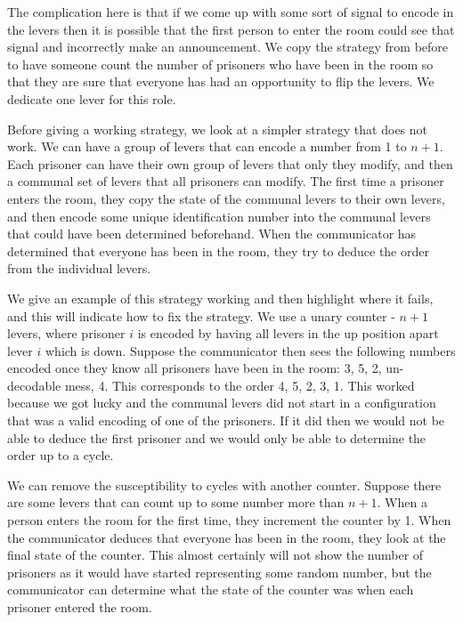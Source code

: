 \begin{parts}
	\begin{solution}
		
		The complication here is that if we come up with some sort of signal to encode in the levers then it is possible that the first person to enter the room could see that signal and incorrectly make an announcement. We copy the strategy from before to have someone count the number of prisoners who have been in the room so that they are sure that everyone has had an opportunity to flip the levers. We dedicate one lever for this role.
		
		Before giving a working strategy, we look at a simpler strategy that does not work. We can have a group of levers that can encode a number from 1 to $n + 1$. Each prisoner can have their own group of levers that only they modify, and then a communal set of levers that all prisoners can modify. The first time a prisoner enters the room, they copy the state of the communal levers to their own levers, and then encode some unique identification number into the communal levers that could have been determined beforehand. When the communicator has determined that everyone has been in the room, they try to deduce the order from the individual levers.
		
		We give an example of this strategy working and then highlight where it fails, and this will indicate how to fix the strategy. We use a unary counter - $n + 1$ levers, where prisoner $i$ is encoded by having all levers in the up position apart lever $i$ which is down. Suppose the communicator then sees the following numbers encoded once they know all prisoners have been in the room: 3, 5, 2, un-decodable mess, 4. This corresponds to the order 4, 5, 2, 3, 1. This worked because we got lucky and the communal levers did not start in a configuration that was a valid encoding of one of the prisoners. If it did then we would not be able to deduce the first prisoner and we would only be able to determine the order up to a cycle.
		
		We can remove the susceptibility to cycles with another counter. Suppose there are some levers that can count up to some number more than $n + 1$. When a person enters the room for the first time, they increment the counter by 1. When the communicator deduces that everyone has been in the room, they look at the final state of the counter. This almost certainly will not show the number of prisoners as it would have started representing some random number, but the communicator can determine what the state of the counter was when each prisoner entered the room.
		

\end{solution}
\end{parts}
